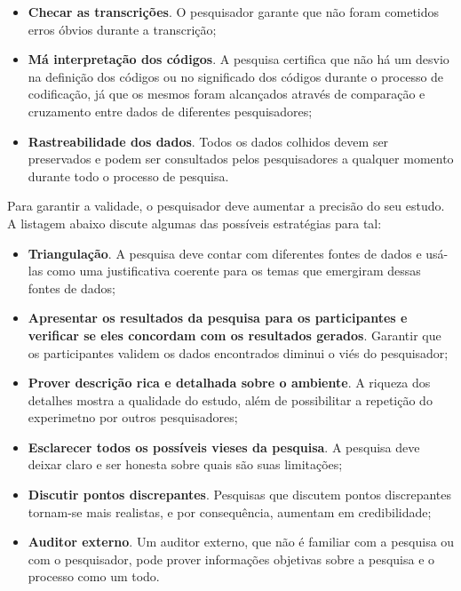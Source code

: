 \begin{itemize}
	\item \textbf{Checar as transcrições}. O pesquisador garante que não foram
	cometidos erros óbvios durante a transcrição;

	\item \textbf{Má interpretação dos códigos}. A pesquisa certifica que não há um
	desvio na definição dos códigos ou no significado dos códigos durante o processo 
	de codificação, já que os mesmos foram alcançados através de comparação e
	cruzamento entre dados de diferentes pesquisadores;
	
	\item \textbf{Rastreabilidade dos dados}. Todos os dados colhidos devem ser
	preservados e podem ser consultados pelos pesquisadores a qualquer momento
	durante todo o processo de pesquisa.

\end{itemize}

Para garantir a validade, o pesquisador deve aumentar a precisão do seu estudo.
A listagem abaixo discute algumas das possíveis estratégias para tal:

\begin{itemize}
	\item \textbf{Triangulação}. A pesquisa deve contar com diferentes fontes
	de dados e usá-las como uma justificativa coerente para os temas que emergiram
	dessas fontes de dados;

	\item \textbf{Apresentar os resultados da pesquisa para os participantes e
	verificar se eles concordam com os resultados gerados}. Garantir que os
	participantes validem os dados encontrados diminui o viés do pesquisador;

	\item \textbf{Prover descrição rica e detalhada sobre o ambiente}. A riqueza
	dos detalhes mostra a qualidade do estudo, além de possibilitar a repetição do
	experimetno por outros pesquisadores;

	\item \textbf{Esclarecer todos os possíveis vieses da pesquisa}. A pesquisa
	deve deixar claro e ser honesta sobre quais são suas limitações;
	
	\item \textbf{Discutir pontos discrepantes}. Pesquisas que discutem pontos
	discrepantes tornam-se mais realistas, e por consequência, aumentam em
	credibilidade;
	
	\item \textbf{Auditor externo}. Um auditor externo, que não é familiar com a
	pesquisa ou com o pesquisador, pode prover informações objetivas sobre a
	pesquisa e o processo como um todo.

\end{itemize} 
